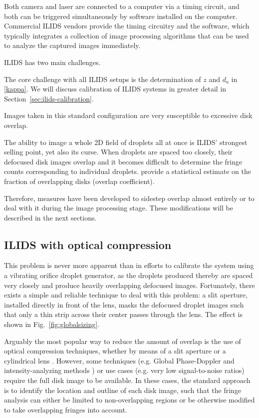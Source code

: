 \documentclass[11.5pt,oneside]{book}
\newcommand*{\figref}[1]{Fig.~\ref{#1}}
\newcommand*{\secref}[1]{Section~\ref{#1}}
\begin{document}
Both camera and laser are connected to a computer via a timing circuit, and both
can be triggered simultaneously by software installed on the computer.
Commercial ILIDS vendors provide the timing circuitry and the software, which
typically integrates a collection of image processing algorithms that can be
used to analyze the captured images immediately.

ILIDS has two main challenges.

The core challenge with all ILIDS setups is the determination of $z$ and $d_a$ in
\eqref{kappa}. We will discuss calibration of ILIDS systems in greater detail in
\secref{sec:ilids-calibration}.

Images taken in this standard configuration are very susceptible to excessive
disk overlap.

The ability to image a whole 2D field of droplets all at once is ILIDS' strongest
selling point, yet also its curse. When droplets are spaced too closely, their
defocused disk images overlap and it becomes difficult to determine the fringe counts
corresponding to individual droplets. \citet{Damaschke02} provide a statistical
estimate on the fraction of overlapping disks (overlap coefficient).

Therefore, measures have been developed to sidestep overlap
almost entirely or to deal with it during the image processing stage. These
modifications will be described in the next sections.

\subsection{ILIDS with optical compression}
This problem is never more apparent than in efforts to calibrate
the system using a vibrating orifice droplet generator, as the droplets produced
thereby are spaced very closely and produce heavily overlapping defocused
images. Fortunately, there exists a simple and reliable technique to deal with
this problem: a slit aperture, installed directly in front of the lens, masks
the defocused droplet images such that only a thin strip across their center
passes through the lens. The effect is shown in \figref{fig:globalsizing}. 

Arguably the most popular way to reduce the amount of overlap is the use of
optical compression techniques, whether by means of a slit aperture \cite{Pan06}
or a cylindrical lens \cite{Kawaguchi02, Maeda02}. However, some techniques
(e.g. Global Phase-Doppler \cite{Damaschke01} and intensity-analyzing
methods \cite{Querel10}) or use cases (e.g. very low signal-to-noise ratios)
require the full disk image to be available. In these cases, the standard
approach is to identify the location and outline of each disk image, such that
the fringe analysis can either be limited to non-overlapping regions or be
otherwise modified to take overlapping fringes into account.
\end{document}
